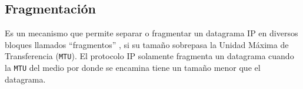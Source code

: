 \subsection*{Fragmentación}         
Es un mecanismo que permite separar o fragmentar un datagrama IP en diversos bloques llamados ``fragmentos'' , si su tamaño sobrepasa la Unidad Máxima de Transferencia (\texttt{MTU}). El protocolo IP solamente fragmenta un datagrama cuando la \texttt{MTU} del medio por donde se encamina tiene un tamaño menor que el datagrama.     
                

